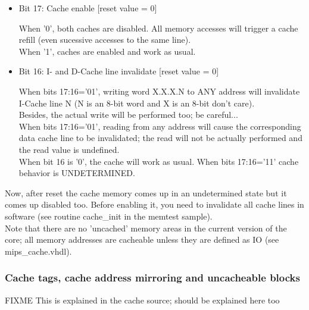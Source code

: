 \documentclass[11pt]{article}
\begin{document}
    \begin{itemize}
    \item Bit 17: Cache enable              [reset value = 0]
    
        When '0', both caches are disabled. All memory accesses will trigger a 
        cache refill (even sucessive accesses to the same line).\\
        When '1', caches are enabled and work as usual.\\
    
    \item Bit 16: I- and D-Cache line invalidate   [reset value = 0]
    
        When bits 17:16='01', writing word X.X.X.N to ANY address will 
        invalidate I-Cache line N (N is an 8-bit word and X is an 8-bit 
        don't care).\\
        
        Besides, the actual write will be performed too; be careful...\\
        
        When bits 17:16='01', reading from any address will cause the 
        corresponding data cache line to be invalidated; the read will not be
        actually performed and the read value is undefined.\\
        
        When bit 16 is '0', the cache will work as usual.
        When bits 17:16='11' cache behavior is UNDETERMINED.\\
    \end{itemize}

    Now, after reset the cache memory comes up in an undetermined state but 
    it comes up disabled too. Before enabling it, you need to invalidate all
    cache lines in software (see routine cache\_init in the memtest sample).\\
    
    Note that there are no 'uncached' memory areas in the current version of
    the core; all memory addresses are cacheable unless they are defined as
    IO (see mips\_cache.vhdl).\\

\subsubsection{Cache tags, cache address mirroring and uncacheable blocks}
\label{cache_tags}

    FIXME This is explained in the cache source; should be explained here too
\end{document}
